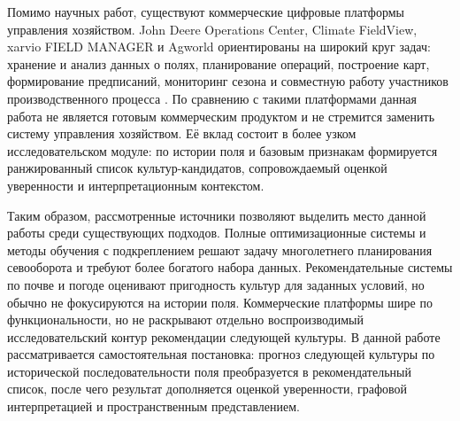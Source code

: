 Помимо научных работ, существуют коммерческие цифровые платформы управления хозяйством. John Deere Operations Center,
Climate FieldView, xarvio FIELD MANAGER и Agworld ориентированы на широкий круг задач: хранение и анализ данных о полях,
планирование операций, построение карт, формирование предписаний, мониторинг сезона и совместную работу участников
производственного процесса
\cite{johndeere2026operations_center,fieldview2026platform,xarvio2026field_manager,agworld2026farm_management}. По
сравнению с такими платформами данная работа не является готовым коммерческим продуктом и не стремится заменить систему
управления хозяйством. Её вклад состоит в более узком исследовательском модуле: по истории поля и базовым признакам
формируется ранжированный список культур-кандидатов, сопровождаемый оценкой уверенности и интерпретационным контекстом.

Таким образом, рассмотренные источники позволяют выделить место данной работы среди существующих подходов. Полные
оптимизационные системы и методы обучения с подкреплением решают задачу многолетнего планирования севооборота и требуют
более богатого набора данных. Рекомендательные системы по почве и погоде оценивают пригодность культур для заданных
условий, но обычно не фокусируются на истории поля. Коммерческие платформы шире по функциональности, но не раскрывают
отдельно воспроизводимый исследовательский контур рекомендации следующей культуры. В данной работе рассматривается
самостоятельная постановка: прогноз следующей культуры по исторической последовательности поля преобразуется в
рекомендательный список, после чего результат дополняется оценкой уверенности, графовой интерпретацией и пространственным
представлением.
